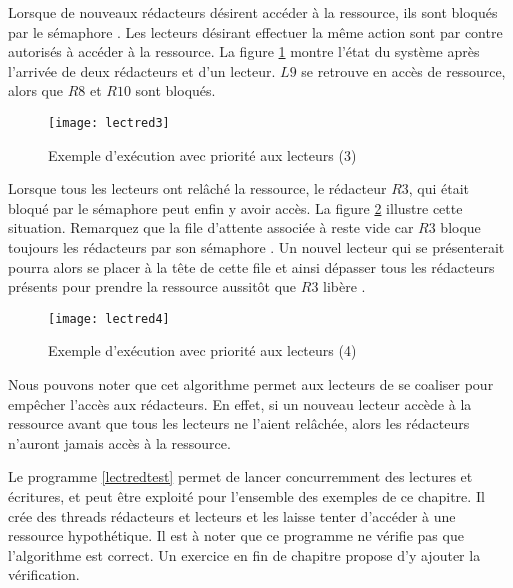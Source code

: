 Lorsque de nouveaux rédacteurs désirent accéder à la ressource, ils sont bloqués par le sémaphore . Les lecteurs désirant effectuer la même action sont par contre autorisés à accéder à la ressource. La figure \ref{fig:lectred3} montre l'état du système après l'arrivée de deux rédacteurs et d'un lecteur. $L9$ se retrouve en accès de ressource, alors que $R8$ et $R10$ sont bloqués.

\begin{figure}[!ht]
  \centering
    \texttt{[image: lectred3]}
    \caption{\label{fig:lectred3}Exemple d'exécution avec priorité aux lecteurs (3)}

\end{figure}

Lorsque tous les lecteurs ont relâché la ressource, le rédacteur $R3$, qui était bloqué par le sémaphore  peut enfin y avoir accès.
La figure \ref{fig:lectred4} illustre cette situation.
Remarquez que la file d'attente associée à  reste vide car $R3$ bloque toujours les rédacteurs par son sémaphore . Un nouvel lecteur qui se présenterait pourra alors se placer à la tête de cette file et ainsi dépasser tous les rédacteurs présents pour prendre la ressource aussitôt que $R3$ libère .

\begin{figure}[!ht]
  \centering
    \texttt{[image: lectred4]}
    \caption{\label{fig:lectred4}Exemple d'exécution avec priorité aux lecteurs (4)}

\end{figure}

Nous pouvons noter que cet algorithme permet aux lecteurs de se coaliser pour empêcher l'accès aux rédacteurs. En effet, si un nouveau lecteur accède à la ressource avant que tous les lecteurs ne l'aient relâchée, alors les rédacteurs n'auront jamais accès à la ressource.

Le programme \ref{lectredtest} permet de lancer concurremment des lectures et écritures, et peut être exploité pour l'ensemble des exemples de ce chapitre. Il crée des threads rédacteurs et lecteurs et les laisse tenter d'accéder à une ressource hypothétique. Il est à noter que ce programme ne vérifie pas que l'algorithme est correct. Un exercice en fin de chapitre propose d'y ajouter la vérification.

